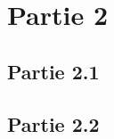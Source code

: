 \section{Partie 2}
\label{sec:partie_2}

\subsection{Partie 2.1}
\label{sec:partie_2_1}

\subsection{Partie 2.2}
\label{sec:partie_2_2}